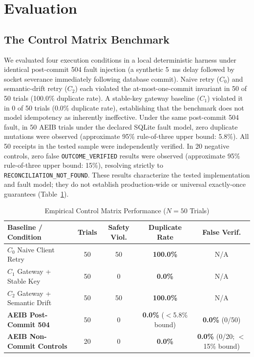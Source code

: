 \documentclass[10pt,journal,compsoc]{IEEEtran}
\begin{document}
\section{Evaluation}

\subsection{The Control Matrix Benchmark}
We evaluated four execution conditions in a local deterministic harness under identical post-commit 504 fault injection (a synthetic 5~ms delay followed by socket severance immediately following database commit). Naive retry ($C_0$) and semantic-drift retry ($C_2$) each violated the at-most-one-commit invariant in 50 of 50 trials (100.0\% duplicate rate). A stable-key gateway baseline ($C_1$) violated it in 0 of 50 trials (0.0\% duplicate rate), establishing that the benchmark does not model idempotency as inherently ineffective. Under the same post-commit 504 fault, in 50 AEIB trials under the declared SQLite fault model, zero duplicate mutations were observed (approximate 95\% rule-of-three upper bound: 5.8\%). All 50 receipts in the tested sample were independently verified. In 20 negative controls, zero false \texttt{OUTCOME\_VERIFIED} results were observed (approximate 95\% rule-of-three upper bound: 15\%), resolving strictly to \texttt{RECONCILIATION\_NOT\_FOUND}. These results characterize the tested implementation and fault model; they do not establish production-wide or universal exactly-once guarantees (Table~\ref{tab:benchmark}).

\begin{table}[htbp]
\caption{Empirical Control Matrix Performance ($N=50$ Trials)}
\label{tab:benchmark}
\centering
\begin{tabular}{lcccc}
\toprule
\textbf{Baseline / Condition} & \textbf{Trials} & \textbf{Safety Viol.} & \textbf{Duplicate Rate} & \textbf{False Verif.} \\
\midrule
$C_0$ Naive Client Retry & 50 & 50 & \textbf{100.0\%} & N/A \\
$C_1$ Gateway + Stable Key & 50 & 0 & \textbf{0.0\%} & N/A \\
$C_2$ Gateway + Semantic Drift & 50 & 50 & \textbf{100.0\%} & N/A \\
\textbf{AEIB Post-Commit 504} & 50 & 0 & \textbf{0.0\%} ($<$5.8\% bound) & \textbf{0.0\%} (0/50) \\
\textbf{AEIB Non-Commit Controls} & 20 & 0 & \textbf{0.0\%} & \textbf{0.0\%} (0/20; $<$15\% bound) \\
\bottomrule
\end{tabular}
\end{table}
\end{document}
